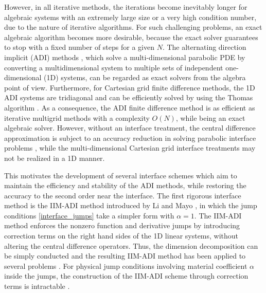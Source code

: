 \documentclass[dissertation]{uathesis}
\begin{document}
\begin{body}
However, in all iterative methods, the iterations become inevitably longer for algebraic systems with an extremely large size or a very high condition number, due to the nature of iterative algorithms. For such challenging problems, an exact algebraic algorithm becomes more desirable, because the exact solver guarantees to stop with a fixed number of steps for a given $N$. 
The alternating direction implicit (ADI) methods \cite{douglas1955numerical2, paeceman1955numerical}, which solve a multi-dimensional parabolic PDE by  converting a multidimensional system to multiple sets of independent one-dimensional (1D) systems, can be regarded as exact solvers from the algebra point of view. Furthermore, for Cartesian grid finite difference methods, the 1D ADI systems are tridiagonal and can be efficiently solved by using the Thomas algorithm \cite{strikwerda2004}. As a consequence, the ADI finite difference method is as efficient as iterative multigrid methods with a complexity $O(N)$, while being an exact algebraic solver. However, without an interface treatment, the central difference approximation is subject to an accuracy reduction in solving parabolic interface problems \cite{geng2013,zhao2014operator}, while the multi-dimensional Cartesian grid interface treatments \cite{adams2002immersed, bouchon2010immersed, bouchon2010immersed2, kandilarov2004immersed, kandilarov2007immersed} may not be realized in a 1D manner. 

This motivates the development of several interface schemes \cite{Iimayo1993,li1999numerical, liu2013iim, liu2014dimension,zhao2015matched,li2017matched} which aim to maintain the efficiency and stability of the ADI methods, while restoring the accuracy to the second order near the interface. The first rigorous interface method is the IIM-ADI method introduced by Li and Mayo \cite{Iimayo1993}, in which the jump conditions \eqref{interface_jumps} take a simpler form with $\alpha=1$. The IIM-ADI method enforces the nonzero function and derivative jumps  by introducing correction terms on the right hand sides of the 1D linear systems, without altering the central difference operators. Thus, the dimension decomposition can be simply conducted and the resulting IIM-ADI method has been applied to several problems \cite{liu2013iim, liu2014dimension}. For physical jump conditions involving material coefficient $\alpha$ inside the jumps, the construction of the IIM-ADI scheme through correction terms is intractable \cite{li1999numerical}. 


\end{body}
\end{document}
